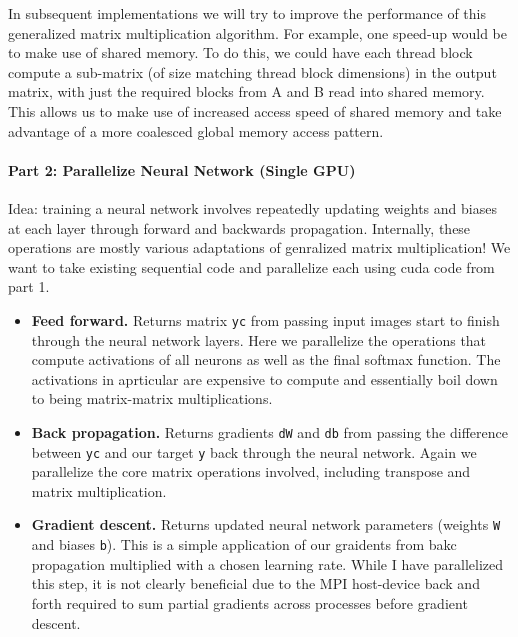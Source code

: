 \documentclass[12pt,letterpaper,twoside]{article}
\begin{document}
In subsequent implementations we will try to improve the performance of this 
generalized matrix multiplication algorithm. For example, one speed-up would be
to make use of shared memory. To do this, we could have each thread block compute
a sub-matrix (of size matching thread block dimensions) in the output matrix, with
just the required blocks from A and B read into shared memory. This allows us to 
make use of increased access speed of shared memory and take advantage of a more
coalesced global memory access pattern.


\paragraph{Part 2: Parallelize Neural Network (Single GPU)} Idea: training a neural
network involves repeatedly updating weights and biases at each layer through forward
and backwards propagation. Internally, these operations are mostly various adaptations
of genralized matrix multiplication! We want to take existing sequential code and 
parallelize each using cuda code from part 1.

\begin{itemize}
    \item \textbf{Feed forward.} Returns matrix \texttt{yc} from passing input images
    start to finish through the neural network layers. Here we parallelize the operations
    that compute activations of all neurons as well as the final softmax function. The 
    activations in aprticular are expensive to compute and essentially boil down to being 
    matrix-matrix multiplications. 

    \item \textbf{Back propagation.} Returns gradients \texttt{dW} and \texttt{db} from 
    passing the difference between \texttt{yc} and our target \texttt{y} back through the 
    neural network. Again we parallelize the core matrix operations involved, including
    transpose and matrix multiplication.

    \item \textbf{Gradient descent.} Returns updated neural network parameters (weights 
    \texttt{W} and biases \texttt{b}). This is a simple application of our graidents from 
    bakc propagation multiplied with a chosen learning rate. While I have parallelized this
    step, it is not clearly beneficial due to the MPI host-device back and forth required 
    to sum partial gradients across processes before gradient descent. 

\end{itemize}
\end{document}
